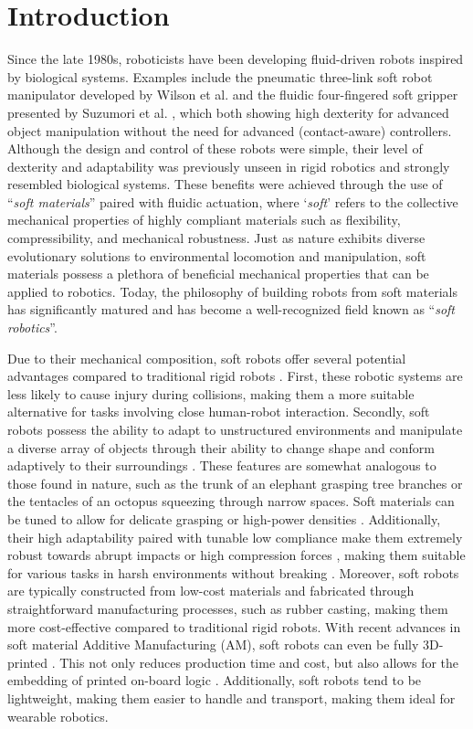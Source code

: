 \section{Introduction}
\label{sec:introduction}
Since the late 1980s, roboticists have been developing fluid-driven robots inspired by biological systems. Examples include the pneumatic three-link soft robot manipulator developed by Wilson et al. \cite{Wilson1989Jun,Weisburd1988,Wilson2007} and the fluidic four-fingered soft gripper presented by Suzumori et al. \cite{Suzumori1991,Suzumori1992}, which both showing high dexterity for advanced object manipulation without the need for advanced (contact-aware) controllers. Although the design and control of these robots were simple, their level of dexterity and adaptability was previously unseen in rigid robotics and strongly resembled biological systems. These benefits were achieved through the use of ``\textit{soft materials}'' paired with fluidic actuation, where `\textit{soft}' refers to the collective mechanical properties of highly compliant materials such as flexibility, compressibility, and mechanical robustness. Just as nature exhibits diverse evolutionary solutions to environmental locomotion and manipulation, soft materials possess a plethora of beneficial mechanical properties that can be applied to robotics. Today, the philosophy of building robots from soft materials has significantly matured and has become a well-recognized field known as ``\textit{soft robotics}''.

Due to their mechanical composition, soft robots offer several potential advantages compared to traditional rigid robots \cite{Rus2015}. First, these robotic systems are less likely to cause injury during collisions, making them a more suitable alternative for tasks involving close human-robot interaction. Secondly, soft robots possess the ability to adapt to unstructured environments and manipulate a diverse array of objects through their ability to change shape and conform adaptively to their surroundings \cite{Hughes2016Nov,Marchese2015}. These features are somewhat analogous to those found in nature, such as the trunk of an elephant grasping tree branches or the tentacles of an octopus squeezing through narrow spaces. Soft materials can be tuned to allow for delicate grasping \cite{Sinatra2019Aug,Galloway2016} or high-power densities \cite{Li2017Dec}. Additionally, their high adaptability paired with tunable low compliance make them extremely robust towards abrupt impacts or high compression forces \cite{Bartlett2015}, making them suitable for various tasks in harsh environments without breaking \cite{Hawkes2017,Li2021Mar,Tolley2014Sep}. Moreover, soft robots are typically constructed from low-cost materials and fabricated through straightforward manufacturing processes, such as rubber casting, making them more cost-effective compared to traditional rigid robots. With recent advances in soft material Additive Manufacturing (AM), soft robots can even be fully 3D-printed \cite{Wallin2018Jun,Xavier2022Jun}. This not only reduces production time and cost, but also allows for the embedding of printed on-board logic \cite{Hubbard2021,Wehner2016}. Additionally, soft robots tend to be lightweight, making them easier to handle and transport, making them ideal for wearable robotics.

